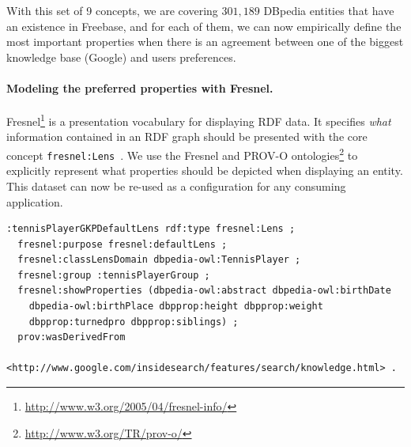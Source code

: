 With this set of 9 concepts, we are covering $301,189$ DBpedia entities that have an existence in Freebase, and for each of them, we can now empirically define the most important properties when there is an agreement between one of the biggest knowledge base (Google) and users preferences.

\paragraph{\textbf{Modeling the preferred properties with Fresnel.}}
\label{sec:fresnel}
Fresnel\footnote{\url{http://www.w3.org/2005/04/fresnel-info/}} is a presentation vocabulary for displaying RDF data. It specifies \textit{what} information contained in an RDF graph should be presented with the core concept \texttt{fresnel:Lens}~\cite{pietriga2006}. We use the Fresnel and PROV-O ontologies\footnote{\url{http://www.w3.org/TR/prov-o/}} to explicitly represent what properties should be depicted when displaying an entity. This dataset can now be re-used as a configuration for any consuming application.
\begin{lstlisting}
:tennisPlayerGKPDefaultLens rdf:type fresnel:Lens ;
  fresnel:purpose fresnel:defaultLens ;
  fresnel:classLensDomain dbpedia-owl:TennisPlayer ;
  fresnel:group :tennisPlayerGroup ;
  fresnel:showProperties (dbpedia-owl:abstract dbpedia-owl:birthDate
    dbpedia-owl:birthPlace dbpprop:height dbpprop:weight
    dbpprop:turnedpro dbpprop:siblings) ;
  prov:wasDerivedFrom
    <http://www.google.com/insidesearch/features/search/knowledge.html> .	
\end{lstlisting}
\normalsize


